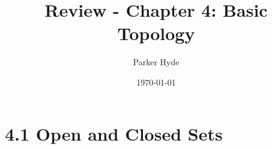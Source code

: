 \documentclass{article}
\begin{document}
\title{Review - Chapter 4: Basic Topology}
\author{Parker Hyde}
\date{\today}
\maketitle

\newtheorem{theorem}{Theorem}
\newtheorem{definition}{Definition}
\newtheorem{exmp}{Example}

\section*{4.1 Open and Closed Sets}
\end{document}
